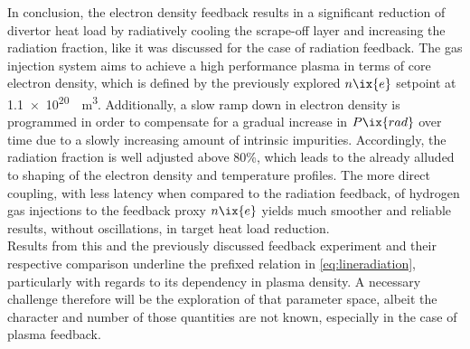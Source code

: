                In conclusion, the electron density feedback results in a significant reduction of divertor heat load by radiatively cooling the scrape-off layer and increasing the radiation fraction, like it was discussed for the case of radiation feedback. The gas injection system aims to achieve a high performance plasma in terms of core electron density, which is defined by the previously explored $n\ix{e}$ setpoint at \SI{1.1e20}{\per\cubic\meter}. Additionally, a slow ramp down in electron density is programmed in order to compensate for a gradual increase in $P\ix{rad}$ over time due to a slowly increasing amount of intrinsic impurities. Accordingly, the radiation fraction is well adjusted above 80\%, which leads to the already alluded to shaping of the electron density and temperature profiles. The more direct coupling, with less latency when compared to the radiation feedback, of hydrogen gas injections to the feedback proxy $n\ix{e}$ yields much smoother and reliable results, without oscillations, in target heat load reduction.\\%
                Results from this and the previously discussed feedback experiment and their respective comparison underline the prefixed relation in \cref{eq:lineradiation}, particularly with regards to its dependency in plasma density. A necessary challenge therefore will be the exploration of that parameter space, albeit the character and number of those quantities are not known, especially in the case of plasma feedback.%
%
